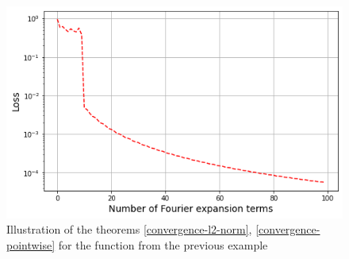 \begin{figure}
	\centering
	\includegraphics[width=\textwidth]{images/chapter2/fourier_quality.png}
	\caption{Illustration of the theorems \ref{convergence-l2-norm}, \ref{convergence-pointwise} for the function from the previous example}
	\label{fig:fourier_quality}
\end{figure}